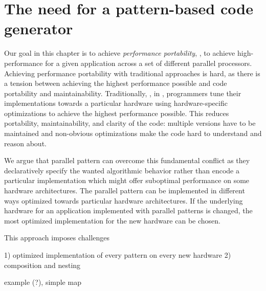 \section{The need for a pattern-based code generator}

Our goal in this chapter is to achieve \emph{performance portability}, \ie, to achieve high-performance for a given application across a set of different parallel processors.
Achieving performance portability with traditional approaches is hard, as there is a tension between achieving the highest performance possible and code portability and maintainability.
Traditionally, \eg, in \OpenCL, programmers tune their implementations towards a particular hardware using hardware-specific optimizations to achieve the highest performance possible.
This reduces portability, maintainability, and clarity of the code:
multiple versions have to be maintained and non-obvious optimizations make the code hard to understand and reason about.

We argue that parallel pattern can overcome this fundamental conflict as they declaratively specify the wanted algorithmic behavior rather than encode a particular implementation which might offer suboptimal performance on some hardware architectures.
The parallel pattern can be implemented in different ways optimized towards particular hardware architectures.
If the underlying hardware for an application implemented with parallel patterns is changed, the most optimized implementation for the new hardware can be chosen.

This approach imposes challenges

1) optimized implementation of every pattern on every new hardware
2) composition and nesting

example (?), simple map
 
